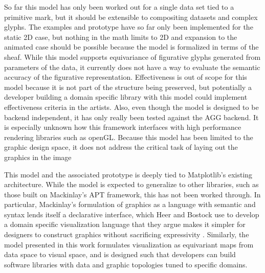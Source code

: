 \documentclass[../main.tex]{subfiles}
\begin{document}
So far this model has only been worked out for a single data set tied to a primitive mark, but it should be extensible to compositing datasets and complex glyphs. The examples and prototype have so far only been implemented for the static 2D case, but nothing in the math limits to 2D and expansion to the animated case should be possible because the model is formalized in terms of the sheaf. While this model supports equivariance of figurative glyphs generated from parameters of the data\cite{beckfeathers2014,byrneFigurativeFramesCritical2017}, it currently does not have a way to evaluate the semantic accuracy of the figurative representation. Effectiveness is out of scope for this model because it is not part of the structure being preserved, but potentially a developer building a domain specific library with this model could implement effectiveness criteria in the artists. Also, even though the model is designed to be backend independent, it has only really been tested against the AGG backend. It is especially unknown how this framework interfaces with high performance rendering libraries such as openGL\cite{CarsonOpenGL1997}.  Because this model has been limited to the graphic design space, it does not address the critical task of laying out the graphics in the image

This model and the associated prototype is deeply tied to Matplotlib's existing architecture. While the model is expected to generalize to other libraries, such as those built on Mackinlay's APT framework, this has not been worked through. In particular, Mackinlay's formulation of graphics as a language with semantic and syntax lends itself a declarative interface\cite{loudenProgrammingLanguagesPrinciples2010}, which Heer and Bostock use to develop a domain specific visualization language that they argue makes it simpler for designers to construct graphics without sacrificing expressivity \cite{heerDeclarative2010}. Similarly, the model presented in this work formulates visualization as equivariant maps from data space to visual space, and is designed such that developers can build software libraries with data and graphic topologies tuned to specific domains. 
\end{document}
